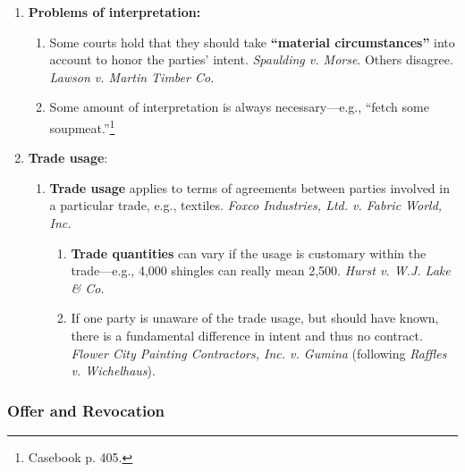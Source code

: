 \begin{enumerate}
\begin{enumerate}
        intended performance to continue for a reasonable 
        time.''\footnote{Casebook p.  401.}
    \end{enumerate}
    \item \textbf{Problems of interpretation:}
    \begin{enumerate}
        \item Some courts hold that they should take \textbf{``material 
        circumstances''} into account to honor the parties' intent. 
        \emph{Spaulding v. Morse}. Others disagree. \emph{Lawson v. Martin 
        Timber Co.}
        \item Some amount of interpretation is always necessary---e.g., 
        ``fetch some soupmeat.''\footnote{Casebook p. 405.}
    \end{enumerate}
    \item \textbf{Trade usage}:
    \begin{enumerate}
        \item \textbf{Trade usage} applies to terms of agreements between 
        parties involved in a particular trade, e.g., textiles. \emph{Foxco 
        Industries, Ltd. v. Fabric World, Inc.}
        \begin{enumerate}
            \item \textbf{Trade quantities} can vary if the usage is customary 
            within the trade---e.g., 4,000 shingles can really mean 2,500.  
            \emph{Hurst v.  W.J. Lake \& Co.}
            \item If one party is unaware of the trade usage, but should have 
            known, there is a fundamental difference in intent and thus no 
            contract. \emph{Flower City Painting Contractors, Inc. v. Gumina} 
            (following \emph{Raffles v. Wichelhaus}).
        \end{enumerate}
    \end{enumerate}
\end{enumerate}

\subsubsection{Offer and Revocation}

